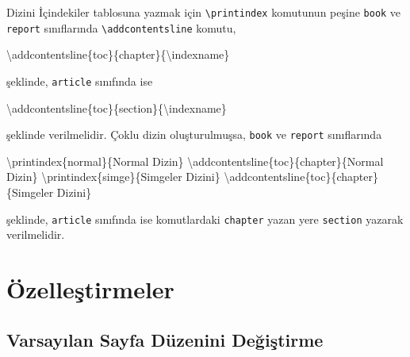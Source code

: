 \documentclass[
  letterpaper,
  DIV=11,
  numbers=noendperiod]{scrreprt}
\newenvironment{Shaded}{\begin{snugshade}}{\end{snugshade}}
\newcommand{\FunctionTok}[1]{\textcolor[rgb]{0.28,0.35,0.67}{#1}}
\newcommand{\NormalTok}[1]{\textcolor[rgb]{0.00,0.23,0.31}{#1}}
\begin{document}
Dizini İçindekiler tablosuna yazmak için
\texttt{\textbackslash{}printindex} komutunun peşine \texttt{book} ve
\texttt{report} sınıflarında \texttt{\textbackslash{}addcontentsline}
komutu,

\begin{Shaded}
\begin{Highlighting}[]
\FunctionTok{\textbackslash{}addcontentsline}\NormalTok{\{toc\}\{chapter\}\{}\FunctionTok{\textbackslash{}indexname}\NormalTok{\}}
\end{Highlighting}
\end{Shaded}

şeklinde, \texttt{article} sınıfında ise

\begin{Shaded}
\begin{Highlighting}[]
\FunctionTok{\textbackslash{}addcontentsline}\NormalTok{\{toc\}\{section\}\{}\FunctionTok{\textbackslash{}indexname}\NormalTok{\}}
\end{Highlighting}
\end{Shaded}

şeklinde verilmelidir. Çoklu dizin oluşturulmuşsa, \texttt{book} ve
\texttt{report} sınıflarında

\begin{Shaded}
\begin{Highlighting}[]
\FunctionTok{\textbackslash{}printindex}\NormalTok{\{normal\}\{Normal Dizin\}}
\FunctionTok{\textbackslash{}addcontentsline}\NormalTok{\{toc\}\{chapter\}\{Normal Dizin\}}
\FunctionTok{\textbackslash{}printindex}\NormalTok{\{simge\}\{Simgeler Dizini\}}
\FunctionTok{\textbackslash{}addcontentsline}\NormalTok{\{toc\}\{chapter\}\{Simgeler Dizini\}}
\end{Highlighting}
\end{Shaded}

şeklinde, \texttt{article} sınıfında ise komutlardaki \texttt{chapter}
yazan yere \texttt{section} yazarak verilmelidir.


\hypertarget{uxf6zelleux15ftirmeler}{%
\chapter{Özelleştirmeler}\label{uxf6zelleux15ftirmeler}}

\hypertarget{varsayux131lan-sayfa-duxfczenini-deux11fiux15ftirme}{%
\section{Varsayılan Sayfa Düzenini
Değiştirme}\label{varsayux131lan-sayfa-duxfczenini-deux11fiux15ftirme}}
\end{document}
